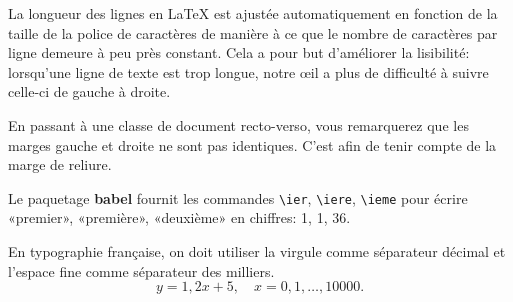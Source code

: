 \documentclass[10pt,french]{article}
\begin{document}
La longueur des lignes en {\LaTeX} est ajustée automatiquement en
fonction de la taille de la police de caractères de manière à ce que le
nombre de caractères par ligne demeure à peu près constant. Cela a
pour but d'améliorer la lisibilité: lorsqu'une ligne de texte est trop
longue, notre œil a plus de difficulté à suivre celle-ci de gauche à
droite.

En passant à une classe de document recto-verso, vous remarquerez que
les marges gauche et droite ne sont pas identiques. C'est afin de
tenir compte de la marge de reliure.

Le paquetage \textbf{babel} fournit les commandes \verb=\ier=,
\verb=\iere=, \verb=\ieme= pour écrire «premier», «première»,
«deuxième» en chiffres: 1{\ier}, 1{\iere}, 36{\ieme}.

En typographie française, on doit utiliser la virgule comme séparateur
décimal et l'espace fine comme séparateur des milliers.
\begin{displaymath}
  y = 1,2x + 5, \quad x = 0, 1, \dots, 10 000.
\end{displaymath}
\end{document}
